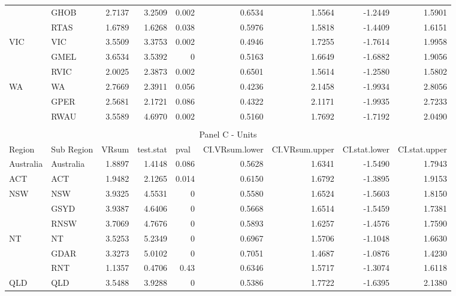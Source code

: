 \begin{table}[htbp]
{\begin{tabular}{llrrrrrrr}
          & GHOB  & 2.7137 & 3.2509 & 0.002 & 0.6534 & 1.5564 & -1.2449 & 1.5901 \\
          & RTAS  & 1.6789 & 1.6268 & 0.038 & 0.5976 & 1.5818 & -1.4409 & 1.6151 \\
    \multirow{3}[0]{*}{VIC} & VIC   & 3.5509 & 3.3753 & 0.002 & 0.4946 & 1.7255 & -1.7614 & 1.9958 \\
          & GMEL  & 3.6534 & 3.5392 & 0     & 0.5163 & 1.6649 & -1.6882 & 1.9056 \\
          & RVIC  & 2.0025 & 2.3873 & 0.002 & 0.6501 & 1.5614 & -1.2580 & 1.5802 \\
    \multirow{3}[1]{*}{WA} & WA    & 2.7669 & 2.3911 & 0.056 & 0.4236 & 2.1458 & -1.9934 & 2.8056 \\
          & GPER  & 2.5681 & 2.1721 & 0.086 & 0.4322 & 2.1171 & -1.9935 & 2.7233 \\
          & RWAU  & 3.5589 & 4.6970 & 0.002 & 0.5160 & 1.7692 & -1.7192 & 2.0490 \\
    \midrule \\
    \multicolumn{9}{c}{Panel C - Units} \\
    \midrule
    Region & Sub Region & \multicolumn{1}{l}{ VRsum} & \multicolumn{1}{l}{ test.stat} & \multicolumn{1}{l}{ pval} & \multicolumn{1}{l}{ CI.VRsum.lower} & \multicolumn{1}{l}{ CI.VRsum.upper} & \multicolumn{1}{l}{ CI.stat.lower} & \multicolumn{1}{l}{ CI.stat.upper} \\
    \midrule
    Australia & Australia & 1.8897 & 1.4148 & 0.086 & 0.5628 & 1.6341 & -1.5490 & 1.7943 \\
    ACT   & ACT   & 1.9482 & 2.1265 & 0.014 & 0.6150 & 1.6792 & -1.3895 & 1.9153 \\
    \multirow{3}[0]{*}{NSW} & NSW   & 3.9325 & 4.5531 & 0     & 0.5580 & 1.6524 & -1.5603 & 1.8150 \\
          & GSYD  & 3.9387 & 4.6406 & 0     & 0.5668 & 1.6514 & -1.5459 & 1.7381 \\
          & RNSW  & 3.7069 & 4.7676 & 0     & 0.5893 & 1.6257 & -1.4576 & 1.7590 \\
    \multirow{3}[0]{*}{NT} & NT    & 3.5253 & 5.2349 & 0     & 0.6967 & 1.5706 & -1.1048 & 1.6630 \\
          & GDAR  & 3.3273 & 5.0102 & 0     & 0.7051 & 1.4687 & -1.0876 & 1.4230 \\
          & RNT   & 1.1357 & 0.4706 & 0.43  & 0.6346 & 1.5717 & -1.3074 & 1.6118 \\
    \multirow{3}[0]{*}{QLD} & QLD   & 3.5488 & 3.9288 & 0     & 0.5386 & 1.7722 & -1.6395 & 2.1380 \\

\end{tabular}}
\end{table}
